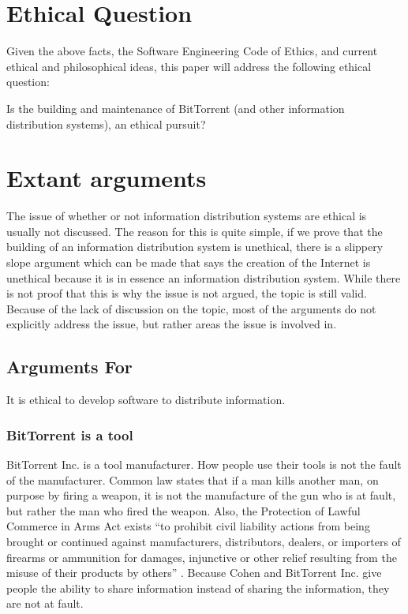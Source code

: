 \documentclass[11pt]{article}
\begin{document}
\section{Ethical Question}

Given the above facts, the Software Engineering Code of Ethics, and current ethical and philosophical ideas, this paper will address the following ethical question:

{\addtolength{\leftskip}{6mm}
Is the building and maintenance of BitTorrent (and other information distribution systems), an ethical pursuit?
}

\section{Extant arguments}

The issue of whether or not information distribution systems are ethical is usually not discussed. The reason for this is quite simple, if we prove that the building of an information distribution system is unethical, there is a slippery slope argument which can be made that says the creation of the Internet is unethical because it is in essence an information distribution system. While there is not proof that this is why the issue is not argued, the topic is still valid. Because of the lack of discussion on the topic, most of the arguments do not explicitly address the issue, but rather areas the issue is involved in.

\subsection{Arguments For}

It is ethical to develop software to distribute information.

\subsubsection{BitTorrent is a tool}
BitTorrent Inc. is a tool manufacturer. How people use their tools is not the fault of the manufacturer. Common law states that if a man kills another man, on purpose by firing a weapon, it is not the manufacture of the gun who is at fault, but rather the man who fired the weapon. Also, the Protection of Lawful Commerce in Arms Act exists ``to prohibit civil liability actions from being brought or continued against manufacturers, distributors, dealers, or importers of firearms or ammunition for damages, injunctive or other relief resulting from the misuse of their products by others'' \cite{firearms}. Because Cohen and BitTorrent Inc. give people the ability to share information instead of sharing the information, they are not at fault.
\end{document}
